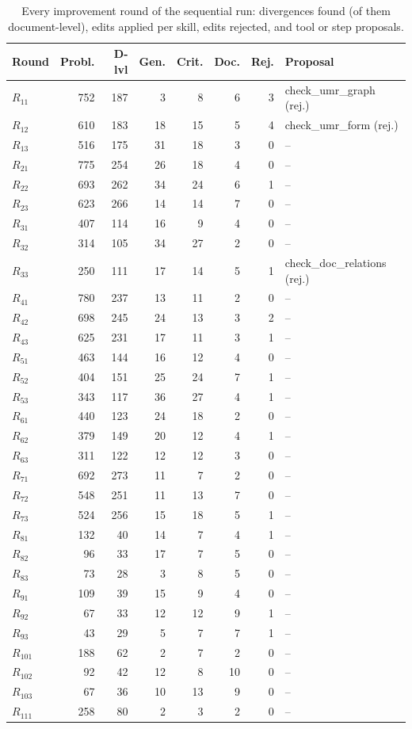 \begin{table}[t]
\centering\scriptsize
\setlength{\tabcolsep}{3pt}
\begin{tabular}{@{}lrrrrrrl@{}}
\toprule
Round & Probl. & D-lvl & Gen. & Crit. & Doc. & Rej. & Proposal \\
\midrule
$R_{11}$ & 752 & 187 & 3 & 8 & 6 & 3 & check\_umr\_graph (rej.) \\
$R_{12}$ & 610 & 183 & 18 & 15 & 5 & 4 & check\_umr\_form (rej.) \\
$R_{13}$ & 516 & 175 & 31 & 18 & 3 & 0 & -- \\
$R_{21}$ & 775 & 254 & 26 & 18 & 4 & 0 & -- \\
$R_{22}$ & 693 & 262 & 34 & 24 & 6 & 1 & -- \\
$R_{23}$ & 623 & 266 & 14 & 14 & 7 & 0 & -- \\
$R_{31}$ & 407 & 114 & 16 & 9 & 4 & 0 & -- \\
$R_{32}$ & 314 & 105 & 34 & 27 & 2 & 0 & -- \\
$R_{33}$ & 250 & 111 & 17 & 14 & 5 & 1 & check\_doc\_relations (rej.) \\
$R_{41}$ & 780 & 237 & 13 & 11 & 2 & 0 & -- \\
$R_{42}$ & 698 & 245 & 24 & 13 & 3 & 2 & -- \\
$R_{43}$ & 625 & 231 & 17 & 11 & 3 & 1 & -- \\
$R_{51}$ & 463 & 144 & 16 & 12 & 4 & 0 & -- \\
$R_{52}$ & 404 & 151 & 25 & 24 & 7 & 1 & -- \\
$R_{53}$ & 343 & 117 & 36 & 27 & 4 & 1 & -- \\
$R_{61}$ & 440 & 123 & 24 & 18 & 2 & 0 & -- \\
$R_{62}$ & 379 & 149 & 20 & 12 & 4 & 1 & -- \\
$R_{63}$ & 311 & 122 & 12 & 12 & 3 & 0 & -- \\
$R_{71}$ & 692 & 273 & 11 & 7 & 2 & 0 & -- \\
$R_{72}$ & 548 & 251 & 11 & 13 & 7 & 0 & -- \\
$R_{73}$ & 524 & 256 & 15 & 18 & 5 & 1 & -- \\
$R_{81}$ & 132 & 40 & 14 & 7 & 4 & 1 & -- \\
$R_{82}$ & 96 & 33 & 17 & 7 & 5 & 0 & -- \\
$R_{83}$ & 73 & 28 & 3 & 8 & 5 & 0 & -- \\
$R_{91}$ & 109 & 39 & 15 & 9 & 4 & 0 & -- \\
$R_{92}$ & 67 & 33 & 12 & 12 & 9 & 1 & -- \\
$R_{93}$ & 43 & 29 & 5 & 7 & 7 & 1 & -- \\
$R_{101}$ & 188 & 62 & 2 & 7 & 2 & 0 & -- \\
$R_{102}$ & 92 & 42 & 12 & 8 & 10 & 0 & -- \\
$R_{103}$ & 67 & 36 & 10 & 13 & 9 & 0 & -- \\
$R_{111}$ & 258 & 80 & 2 & 3 & 2 & 0 & -- \\
\bottomrule
\end{tabular}
\caption{Every improvement round of the sequential run: divergences found (of them document-level), edits applied per skill, edits rejected, and tool or step proposals.}
\label{tab:rounds}
\end{table}
